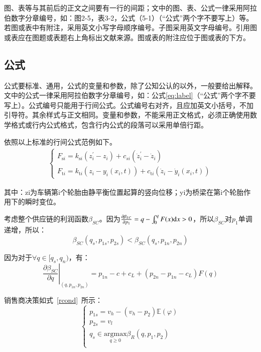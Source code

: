 图、表等与其前后的正文之间要有一行的间距；文中的图、表、公式一律采用阿拉伯数字分章编号，如：图2-5，表3-2，公式（5-1）（“公式”两个字不要写上）等。若图或表中有附注，采用英文小写字母顺序编号。子图采用英文字母编号。引用图或表应在图题或表题右上角标出文献来源。图或表的附注应位于图或表的下方。

\subsection{公式}

公式要标准、通用，公式的变量和参数，除了公知公认的以外，一般要给出解释。文中的公式一律采用阿拉伯数字分章编号，如：公式\eqref{eq:label}（“公式”两个字不要写上）。公式编号只能用于行间公式。公式编号右对齐，且应加英文小括号，不加引导符。其余样式与正文相同。变量和参数，不能采用正文格式，必须正确使用数学格式或行内公式格式，包含行内公式的段落可以采用单倍行距。

依照以上标准的行间公式范例如下。
\begin{align}
\label{eq:label}
	\left\{\begin{array}{l}
        F_{\mathrm{s} i}=k_{\mathrm{s} i}\left(z_{i}^{\prime}-z_{i}\right)+c_{s i}\left(\dot{z}_{i}^{\prime}-\dot{z}_{i}\right) \\
        F_{\mathrm{t} i}=k_{\mathrm{t} i}\left(z_{i}-y_{i}\left(x_{i}, t\right)\right)+c_{\mathrm{t} i}\left(\dot{z}_{i}-\dot{y}_{i}\left(x_{i}, t\right)\right)
        \end{array}\right.
\end{align}

其中：zi为车辆第i个轮胎由静平衡位置起算的竖向位移；yi为桥梁在第i个轮胎作用下的瞬时变位。

考虑整个供应链的利润函数$\beta_{SC}$。因为$\frac{\partial\beta_{SC}}{\partial p_1}=q-\int_0^q F(x)\mathrm{d} x>0$，所以$\beta_{SC}$对$p_1$单调递增，所以：
\begin{equation}
\label{dscNoStgProof0}
\beta_{SC}(q_s,p_{1s},p_{2s})<\beta_{SC}(q_s,p_{1n},p_{2n})
\end{equation}

因为对于$\forall q\in[q_s, q_n)$，有：
\[ \left.\frac{\partial \beta_{SC}}{\partial q}\right|_{(q,p_{1n},p_{2n})}=p_{1n}-c+c_L+(p_{2n}-p_{1n}-c_L)F(q) \]

销售商决策如式~\eqref{rcond}~所示：
\begin{equation}
\label{rcond}
\left\{\begin{array}{l}
p_{1s}=v_h-(v_h-p_2)\mathbb{E}(\varphi) \\
p_{2s}=v_l \\
q_s \in \underset{q \geq 0}{\mathrm{argmax}} \beta_R (q, p_1, p_2) \\
\end{array}\right.
\end{equation}

